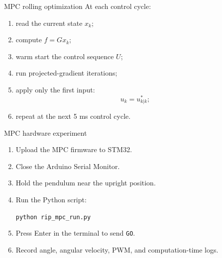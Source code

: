 \documentclass[aspectratio=169]{beamer}
\begin{document}
\begin{frame}{MPC rolling optimization}
At each control cycle:
\begin{enumerate}
    \item read the current state $x_k$;
    \vspace{0.15cm}
    \item compute $f=Gx_k$;
    \vspace{0.15cm}
    \item warm start the control sequence $U$;
    \vspace{0.15cm}
    \item run projected-gradient iterations;
    \vspace{0.15cm}
    \item apply only the first input:
    \[
    u_k=u^*_{k|k};
    \]
    \vspace{0.05cm}
    \item repeat at the next 5 ms control cycle.
\end{enumerate}
\end{frame}

\begin{frame}{MPC hardware experiment}
\begin{enumerate}
    \item Upload the MPC firmware to STM32.
    \vspace{0.22cm}
    \item Close the Arduino Serial Monitor.
    \vspace{0.22cm}
    \item Hold the pendulum near the upright position.
    \vspace{0.22cm}
    \item Run the Python script:
    \vspace{0.08cm}
    \begin{center}
    \texttt{python rip\_mpc\_run.py}
    \end{center}
    \vspace{0.15cm}
    \item Press Enter in the terminal to send \texttt{GO}.
    \vspace{0.22cm}
    \item Record angle, angular velocity, PWM, and computation-time logs.
\end{enumerate}
\end{frame}
\end{document}
